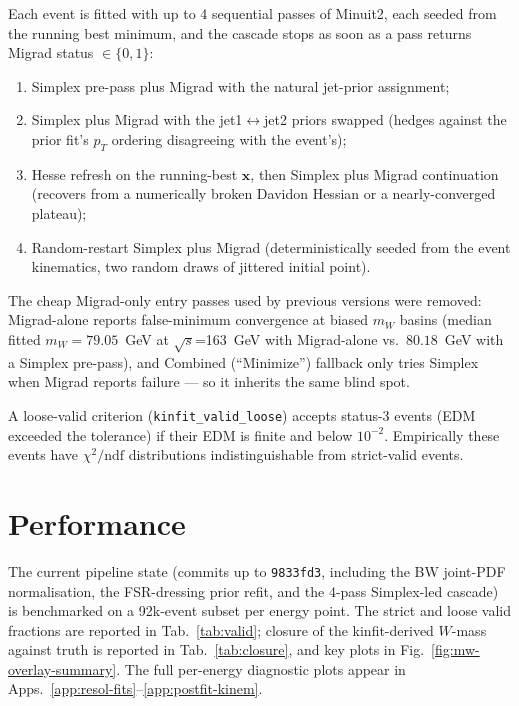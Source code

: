 \documentclass[11pt,a4paper]{article}
\newcommand{\sqs}{\ensuremath{\sqrt{s}}\xspace}
\newcommand{\codename}[1]{\texttt{\small #1}}
\newcommand{\chitndf}{\ensuremath{\chi^2/\text{ndf}}\xspace}
\begin{document}
Each event is fitted with up to 4 sequential passes of Minuit2, each
seeded from the running best minimum, and the cascade stops as soon as
a pass returns Migrad status $\in\{0,1\}$:
\begin{enumerate}[label=(\arabic*),leftmargin=*]
  \item Simplex pre-pass plus Migrad with the natural jet-prior
        assignment;
  \item Simplex plus Migrad with the jet1$\leftrightarrow$jet2 priors
        swapped (hedges against the prior fit's $p_T$ ordering
        disagreeing with the event's);
  \item Hesse refresh on the running-best $\bm{x}$, then Simplex plus
        Migrad continuation (recovers from a numerically broken
        Davidon Hessian or a nearly-converged plateau);
  \item Random-restart Simplex plus Migrad (deterministically seeded
        from the event kinematics, two random draws of jittered initial
        point).
\end{enumerate}
The cheap Migrad-only entry passes used by previous versions were
removed: Migrad-alone reports false-minimum convergence at biased
$m_W$ basins (median fitted $m_W=79.05$~GeV at \sqs=163~GeV with
Migrad-alone vs.\ $80.18$~GeV with a Simplex pre-pass), and Combined
(``Minimize'') fallback only tries Simplex when Migrad reports failure
--- so it inherits the same blind spot.

A loose-valid criterion (\codename{kinfit\_valid\_loose}) accepts
status-3 events (EDM exceeded the tolerance) if their EDM is finite
and below $10^{-2}$. Empirically these events have \chitndf
distributions indistinguishable from strict-valid events.


\section{Performance}\label{sec:results}

The current pipeline state (commits up to \codename{9833fd3}, including
the BW joint-PDF normalisation, the FSR-dressing prior refit, and the
4-pass Simplex-led cascade) is benchmarked on a 92k-event subset per
energy point. The strict and loose valid fractions are reported in
Tab.~\ref{tab:valid}; closure of the kinfit-derived $W$-mass against
truth is reported in Tab.~\ref{tab:closure}, and key plots in
Fig.~\ref{fig:mw-overlay-summary}. The full per-energy diagnostic
plots appear in Apps.~\ref{app:resol-fits}--\ref{app:postfit-kinem}.
\end{document}
